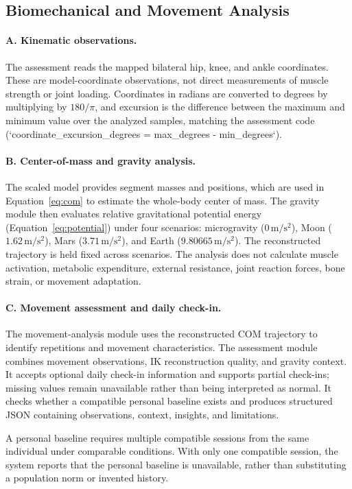 \documentclass[11pt,a4paper]{article}
\begin{document}
\subsection{Biomechanical and Movement Analysis}

\paragraph{A. Kinematic observations.} The assessment reads the mapped bilateral hip, knee, and ankle coordinates. These are model-coordinate observations, not direct measurements of muscle strength or joint loading. Coordinates in radians are converted to degrees by multiplying by $180/\pi$, and excursion is the difference between the maximum and minimum value over the analyzed samples, matching the assessment code (`coordinate_excursion_degrees = max_degrees - min_degrees`).

\paragraph{B. Center-of-mass and gravity analysis.} The scaled model provides segment masses and positions, which are used in Equation~\ref{eq:com} to estimate the whole-body center of mass. The gravity module then evaluates relative gravitational potential energy (Equation~\ref{eq:potential}) under four scenarios: microgravity ($0\,\mathrm{m/s^2}$), Moon ($1.62\,\mathrm{m/s^2}$), Mars ($3.71\,\mathrm{m/s^2}$), and Earth ($9.80665\,\mathrm{m/s^2}$). The reconstructed trajectory is held fixed across scenarios. The analysis does not calculate muscle activation, metabolic expenditure, external resistance, joint reaction forces, bone strain, or movement adaptation.

\paragraph{C. Movement assessment and daily check-in.} The movement-analysis module uses the reconstructed COM trajectory to identify repetitions and movement characteristics. The assessment module combines movement observations, IK reconstruction quality, and gravity context. It accepts optional daily check-in information and supports partial check-ins; missing values remain unavailable rather than being interpreted as normal. It checks whether a compatible personal baseline exists and produces structured JSON containing observations, context, insights, and limitations.

A personal baseline requires multiple compatible sessions from the same individual under comparable conditions. With only one compatible session, the system reports that the personal baseline is unavailable, rather than substituting a population norm or invented history.
\end{document}
